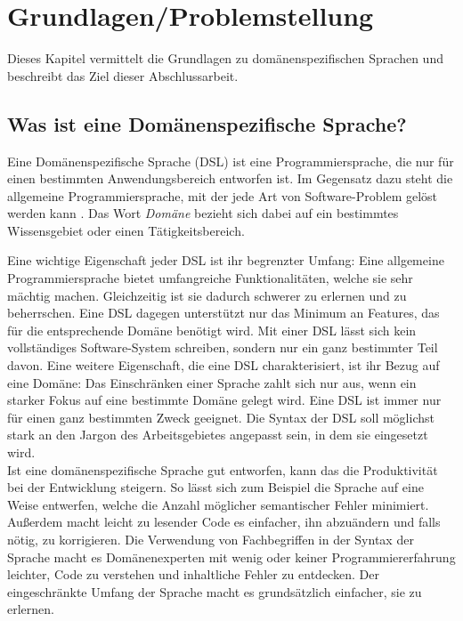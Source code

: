 
\chapter{Grundlagen/Problemstellung}\label{chp:2:grundlagen}
Dieses Kapitel vermittelt die Grundlagen zu domänenspezifischen Sprachen und beschreibt das Ziel dieser Abschlussarbeit.

\section{Was ist eine Domänenspezifische Sprache?}\label{sct:2.1:dsldef}
Eine Domänenspezifische Sprache (DSL) ist eine Programmiersprache, die nur für einen bestimmten Anwendungsbereich entworfen ist. Im Gegensatz dazu steht die allgemeine Programmiersprache, mit der jede Art von Software-Problem gelöst werden kann \cite{www:fowlerDSL}. Das Wort \emph{Domäne} bezieht sich dabei auf ein bestimmtes Wissensgebiet oder einen Tätigkeitsbereich.

Eine wichtige Eigenschaft jeder DSL ist ihr begrenzter Umfang: Eine allgemeine Programmiersprache bietet umfangreiche Funktionalitäten, welche sie sehr mächtig machen. Gleichzeitig ist sie dadurch schwerer zu erlernen und zu beherrschen. Eine DSL dagegen unterstützt nur das Minimum an Features, das für die entsprechende Domäne benötigt wird. Mit einer DSL lässt sich kein vollständiges Software-System schreiben, sondern nur ein ganz bestimmter Teil davon.
Eine weitere Eigenschaft, die eine DSL charakterisiert, ist ihr Bezug auf eine Domäne: Das Einschränken einer Sprache zahlt sich nur aus, wenn ein starker Fokus auf eine bestimmte Domäne gelegt wird. Eine DSL ist immer nur für einen ganz bestimmten Zweck geeignet\cite{book:fowlerDSL}. Die Syntax der DSL soll möglichst stark an den Jargon des Arbeitsgebietes angepasst sein, in dem sie eingesetzt wird.
\\ %
Ist eine domänenspezifische Sprache gut entworfen, kann das die Produktivität bei der Entwicklung steigern. So lässt sich zum Beispiel die Sprache auf eine Weise entwerfen, welche die Anzahl möglicher semantischer Fehler minimiert. Außerdem macht leicht zu lesender Code es einfacher, ihn abzuändern und falls nötig, zu korrigieren. Die Verwendung von Fachbegriffen in der Syntax der Sprache macht es Domänenexperten mit wenig oder keiner Programmiererfahrung leichter, Code zu verstehen und inhaltliche Fehler zu entdecken. Der eingeschränkte Umfang der Sprache macht es grundsätzlich einfacher, sie zu erlernen.


